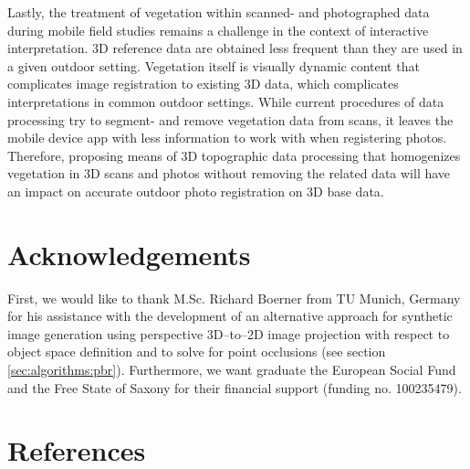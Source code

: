 \documentclass[review]{elsarticle}
\begin{document}
Lastly, the treatment of vegetation within scanned- and photographed data during mobile field studies remains a challenge in the context of interactive interpretation. 3D reference data are obtained less frequent than they are used in a given outdoor setting. Vegetation itself is visually dynamic content that complicates image registration to existing 3D data, which complicates interpretations in common outdoor settings. While current procedures of data processing try to segment- and remove vegetation data from scans, it leaves the mobile device app with less information to work with when registering photos. Therefore, proposing means of 3D topographic data processing that homogenizes vegetation in 3D scans and photos without removing the related data will have an impact on accurate outdoor photo registration on 3D base data.




\section*{Acknowledgements}
First, we would like to thank M.Sc. Richard Boerner from TU Munich, Germany for his assistance with the development of an alternative approach for synthetic image generation using perspective 3D--to--2D image projection with respect to object space definition and to solve for point occlusions (see section \ref{sec:algorithms:pbr}). Furthermore, we want graduate the European Social Fund and the Free State of Saxony for their financial support (funding no. 100235479).

\section*{References}


\end{document}
